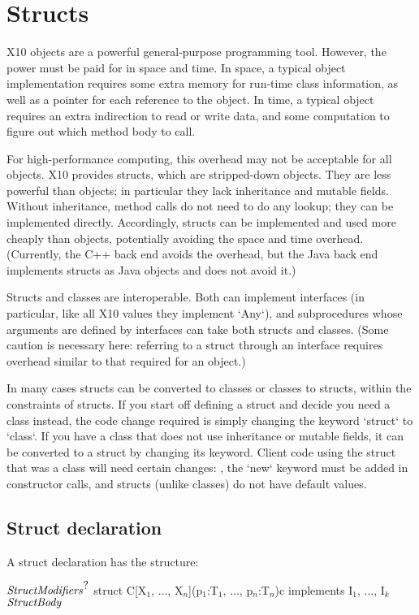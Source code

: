 \chapter{Structs}
\label{XtenStructs}
\label{StructClasses}
\label{Structs}

X10 objects are a powerful general-purpose programming tool. However, the
power must be paid for in space and time. In space, a typical object
implementation requires some extra memory for run-time class information, as
well as a pointer for each reference to the object.  In time, a typical object
requires an extra indirection to read or write data, and some computation to
figure out which method body to call.  

For high-performance computing, this overhead may not be acceptable for all
objects. X10 provides structs, which are stripped-down objects. They are less
powerful than objects; in particular they lack inheritance and mutable fields.
Without inheritance, method calls do not need to do any lookup; they can be
implemented directly. Accordingly, structs can be implemented and used more
cheaply than objects, potentially avoiding the space and time overhead.
(Currently, the C++ back end avoids the overhead, but the Java back end
implements structs as Java objects and does not avoid it.)

Structs and classes are interoperable. Both can implement interfaces (in
particular, like all X10 values they implement \xcd`Any`), and subprocedures
whose arguments are defined by interfaces can take both structs and classes.
(Some caution is necessary here: referring to a struct through an interface
requires overhead similar to that required for an object.)

In many cases structs can be converted to classes or classes to structs,
within the constraints of structs. If you start off defining a struct and
decide you need a class instead, the code change required is simply changing
the keyword \xcd`struct` to \xcd`class`. If you have a class that does not use
inheritance or mutable fields, it can be converted to a struct by changing its
keyword. Client code using the struct that was a class will need certain
changes: \eg, the \xcd`new` keyword must be added in constructor calls, and
structs (unlike classes) do not have default values.



\section{Struct declaration}
A struct declaration has the structure: 
\begin{xtenmath}
$\mbox{\emph{StructModifiers}}^{\mbox{?}}$
struct C[X$_1$, $\ldots$, X$_n$](p$_1$:T$_1$, $\ldots$, p$_n$:T$_n$){c} 
   implements I$_1$, $\ldots$, I$_k$ {
$\mbox{\emph{StructBody}}$
}
\end{xtenmath}


